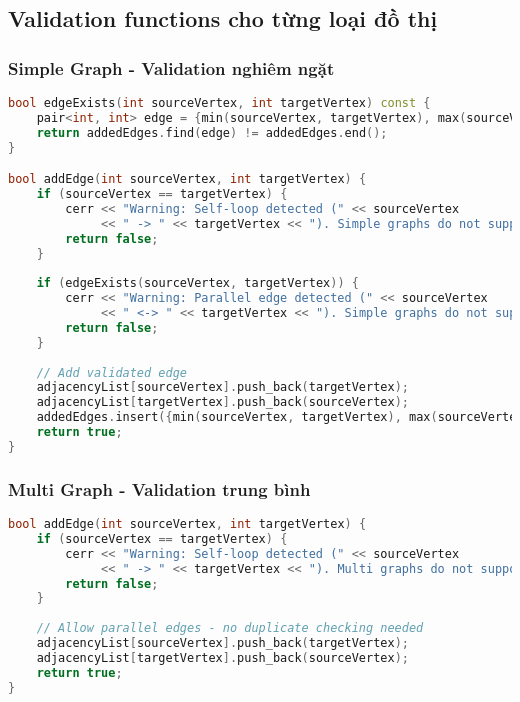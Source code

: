 \documentclass[12pt]{article}
\begin{document}
\subsection*{Validation functions cho từng loại đồ thị}

\subsubsection*{Simple Graph - Validation nghiêm ngặt}
\begin{lstlisting}[language=C++, basicstyle=\ttfamily\footnotesize, frame=single]
bool edgeExists(int sourceVertex, int targetVertex) const {
    pair<int, int> edge = {min(sourceVertex, targetVertex), max(sourceVertex, targetVertex)};
    return addedEdges.find(edge) != addedEdges.end();
}

bool addEdge(int sourceVertex, int targetVertex) {
    if (sourceVertex == targetVertex) {
        cerr << "Warning: Self-loop detected (" << sourceVertex 
             << " -> " << targetVertex << "). Simple graphs do not support self-loops.\n";
        return false;
    }
    
    if (edgeExists(sourceVertex, targetVertex)) {
        cerr << "Warning: Parallel edge detected (" << sourceVertex 
             << " <-> " << targetVertex << "). Simple graphs do not support parallel edges.\n";
        return false;
    }
    
    // Add validated edge
    adjacencyList[sourceVertex].push_back(targetVertex);
    adjacencyList[targetVertex].push_back(sourceVertex);
    addedEdges.insert({min(sourceVertex, targetVertex), max(sourceVertex, targetVertex)});
    return true;
}
\end{lstlisting}

\subsubsection*{Multi Graph - Validation trung bình}
\begin{lstlisting}[language=C++, basicstyle=\ttfamily\footnotesize, frame=single]
bool addEdge(int sourceVertex, int targetVertex) {
    if (sourceVertex == targetVertex) {
        cerr << "Warning: Self-loop detected (" << sourceVertex 
             << " -> " << targetVertex << "). Multi graphs do not support self-loops.\n";
        return false;
    }
    
    // Allow parallel edges - no duplicate checking needed
    adjacencyList[sourceVertex].push_back(targetVertex);
    adjacencyList[targetVertex].push_back(sourceVertex);
    return true;
}
\end{lstlisting}
\end{document}
